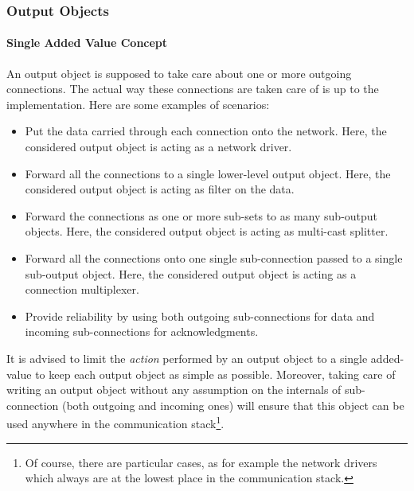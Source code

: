 \documentclass[11pt]{book}
\begin{document}
%
\subsubsection{Output Objects}
\label{sec:output-objects}


\paragraph{Single Added Value Concept}
\label{sec:single-added-value}

An output object is supposed to take care about one or more outgoing
connections. The actual way these connections are taken care of is up
to the implementation. Here are some examples of scenarios:
\begin{itemize}

\item Put the data carried through each connection onto the network.
  Here, the considered output object is acting as a network driver.

\item Forward all the connections to a single lower-level output
  object. Here, the considered output object is acting as filter on
  the data.

\item Forward the connections as one or more sub-sets to as many
  sub-output objects. Here, the considered output object is acting as
  multi-cast splitter.

\item Forward all the connections onto one single sub-connection
  passed to a single sub-output object. Here, the considered output
  object is acting as a connection multiplexer.

\item Provide reliability by using both outgoing sub-connections for
  data and incoming sub-connections for acknowledgments.

\end{itemize}

It is advised to limit the \emph{action} performed by an output object
to a single added-value to keep each output object as simple as
possible. Moreover, taking care of writing an output object without
any assumption on the internals of sub-connection (both outgoing and
incoming ones) will ensure that this object can be used anywhere in
the communication stack\footnote{Of course, there are particular
  cases, as for example the network drivers which always are at the
  lowest place in the communication stack.}.
\end{document}

